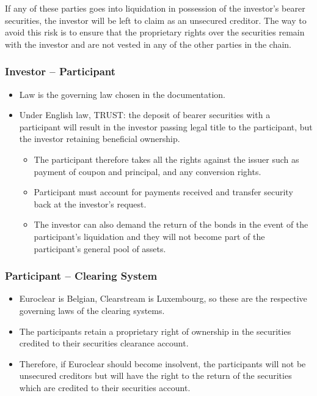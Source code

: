 \documentclass[
]{article}
\providecommand{\tightlist}{%
  \setlength{\itemsep}{0pt}\setlength{\parskip}{0pt}}
\begin{document}
If any of these parties goes into liquidation in possession of the
investor's bearer securities, the investor will be left to claim as an
unsecured creditor. The way to avoid this risk is to ensure that the
proprietary rights over the securities remain with the investor and are
not vested in any of the other parties in the chain.

\hypertarget{investor-participant}{%
\subsubsection{Investor -- Participant}\label{investor-participant}}

\begin{itemize}
\tightlist
\item
  Law is the governing law chosen in the documentation.
\item
  Under English law, TRUST: the deposit of bearer securities with a
  participant will result in the investor passing legal title to the
  participant, but the investor retaining beneficial ownership.

  \begin{itemize}
  \tightlist
  \item
    The participant therefore takes all the rights against the issuer
    such as payment of coupon and principal, and any conversion rights.
  \item
    Participant must account for payments received and transfer security
    back at the investor's request.
  \item
    The investor can also demand the return of the bonds in the event of
    the participant's liquidation and they will not become part of the
    participant's general pool of assets.
  \end{itemize}
\end{itemize}

\hypertarget{participant-clearing-system}{%
\subsubsection{Participant -- Clearing
System}\label{participant-clearing-system}}

\begin{itemize}
\tightlist
\item
  Euroclear is Belgian, Clearstream is Luxembourg, so these are the
  respective governing laws of the clearing systems.
\item
  The participants retain a proprietary right of ownership in the
  securities credited to their securities clearance account.
\item
  Therefore, if Euroclear should become insolvent, the participants will
  not be unsecured creditors but will have the right to the return of
  the securities which are credited to their securities account.
\end{itemize}
\end{document}
